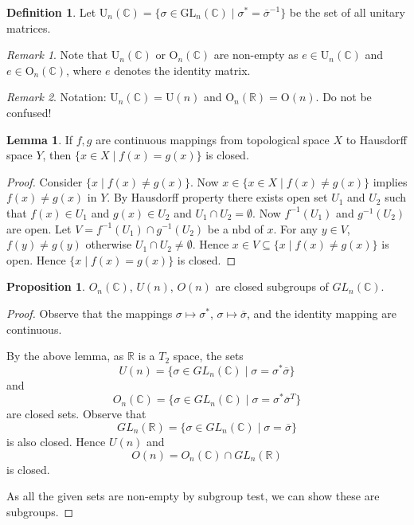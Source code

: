 \documentclass[11pt]{article}
\theoremstyle{definition}
\newtheorem{definition}{Definition}[section]
\newtheorem{lemma}{Lemma}[section]
\newtheorem{proposition}{Proposition}[section]
\theoremstyle{remark}
\newtheorem{remark}{Remark}[section]
\begin{document}
\begin{definition}\label{def:unitary_matrices}
Let $\mathrm{U}_n(\mathbb{C}) = \{\sigma \in \mathrm{GL}_n(\mathbb{C}) \mid \sigma^* = \overline{\sigma}^{-1}\}$ be the set of all unitary matrices.
\end{definition}

\begin{remark}\label{rem:non_empty}
Note that $\mathrm{U}_n(\mathbb{C})$ or $\mathrm{O}_n(\mathbb{C})$ are non-empty as $e \in \mathrm{U}_n(\mathbb{C})$ and $e \in \mathrm{O}_n(\mathbb{C})$, where $e$ denotes the identity matrix.
\end{remark}

\begin{remark}\label{rem:notation}
Notation: $\mathrm{U}_n(\mathbb{C}) = \mathrm{U}(n)$ and $\mathrm{O}_n(\mathbb{R}) = \mathrm{O}(n)$. Do not be confused!
\end{remark}

\begin{lemma}\label{lem:equality_set_closed}
If $f, g$ are continuous mappings from topological space $X$ to Hausdorff space $Y$, then
$\{ x \in X \mid f(x) = g(x) \}$ is closed.
\end{lemma}

\begin{proof}
Consider $\{ x \mid f(x) \neq g(x) \}$. Now
$x \in \{ x \in X \mid f(x) \neq g(x) \}$ implies $f(x) \neq g(x)$
in $Y$. By Hausdorff property there exists open
set $U_1$ and $U_2$ such that $f(x) \in U_1$ and
$g(x) \in U_2$ and $U_1 \cap U_2 = \emptyset$.
Now $f^{-1}(U_1)$ and $g^{-1}(U_2)$ are open.
Let $V = f^{-1}(U_1) \cap g^{-1}(U_2)$ be a nbd of $x$.
For any $y \in V$, $f(y) \neq g(y)$ otherwise
$U_1 \cap U_2 \neq \emptyset$. Hence $x \in V \subseteq \{ x \mid f(x) \neq g(x) \}$
is open. Hence $\{ x \mid f(x) = g(x) \}$ is closed.
\end{proof}

\begin{proposition}\label{prop:closed_subgroups}
$O_n(\mathbb{C})$, $U(n)$, $O(n)$ are closed subgroups of $GL_n(\mathbb{C})$.
\end{proposition}

\begin{proof}
Observe that the mappings $\sigma \mapsto \sigma^*$, $\sigma \mapsto \overline{\sigma}$, and the identity mapping are continuous.

By the above lemma, as $\mathbb{R}$ is a $T_2$ space, the sets
\[ U(n) = \{\sigma \in GL_n(\mathbb{C}) \mid \sigma = \sigma^* \overline{\sigma}\} \]
and
\[ O_n(\mathbb{C}) = \{\sigma \in GL_n(\mathbb{C}) \mid \sigma = \sigma^* \overline{\sigma}^T \} \]
are closed sets. Observe that
\[ GL_n(\mathbb{R}) = \{\sigma \in GL_n(\mathbb{C}) \mid \sigma = \overline{\sigma}\} \]
is also closed. Hence $U(n)$ and
\[ O(n) = O_n(\mathbb{C}) \cap GL_n(\mathbb{R}) \]
is closed.

As all the given sets are non-empty by subgroup test, we can show these are subgroups.
\end{proof}
\end{document}

